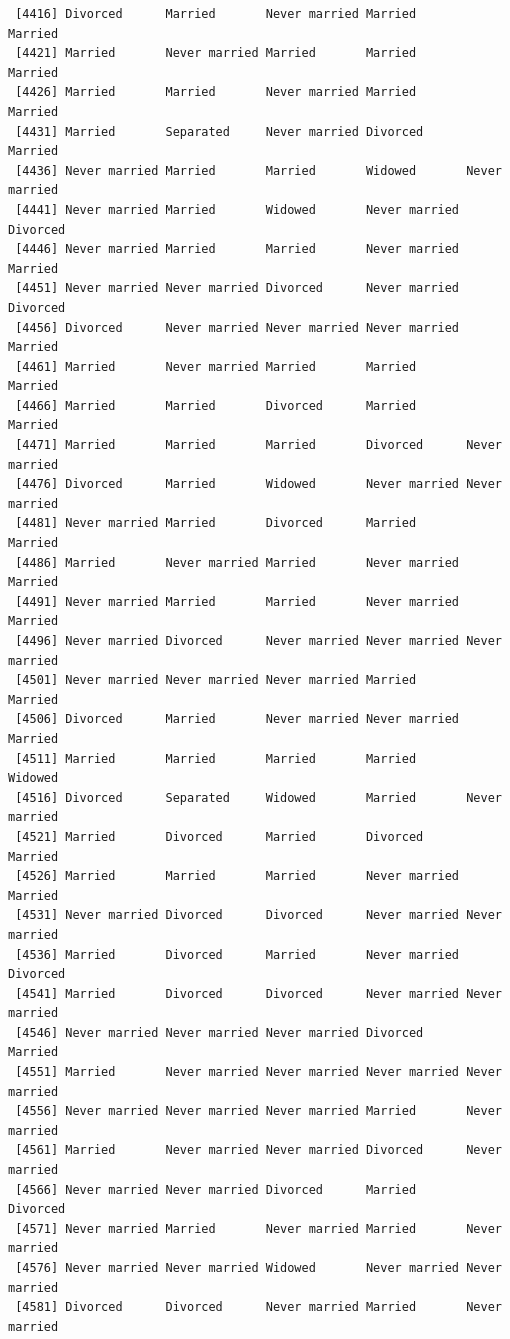 \documentclass[
  letterpaper,
  DIV=11,
  numbers=noendperiod,
  oneside]{scrartcl}
\begin{document}
\begin{verbatim}
 [4416] Divorced      Married       Never married Married       Married      
 [4421] Married       Never married Married       Married       Married      
 [4426] Married       Married       Never married Married       Married      
 [4431] Married       Separated     Never married Divorced      Married      
 [4436] Never married Married       Married       Widowed       Never married
 [4441] Never married Married       Widowed       Never married Divorced     
 [4446] Never married Married       Married       Never married Married      
 [4451] Never married Never married Divorced      Never married Divorced     
 [4456] Divorced      Never married Never married Never married Married      
 [4461] Married       Never married Married       Married       Married      
 [4466] Married       Married       Divorced      Married       Married      
 [4471] Married       Married       Married       Divorced      Never married
 [4476] Divorced      Married       Widowed       Never married Never married
 [4481] Never married Married       Divorced      Married       Married      
 [4486] Married       Never married Married       Never married Married      
 [4491] Never married Married       Married       Never married Married      
 [4496] Never married Divorced      Never married Never married Never married
 [4501] Never married Never married Never married Married       Married      
 [4506] Divorced      Married       Never married Never married Married      
 [4511] Married       Married       Married       Married       Widowed      
 [4516] Divorced      Separated     Widowed       Married       Never married
 [4521] Married       Divorced      Married       Divorced      Married      
 [4526] Married       Married       Married       Never married Married      
 [4531] Never married Divorced      Divorced      Never married Never married
 [4536] Married       Divorced      Married       Never married Divorced     
 [4541] Married       Divorced      Divorced      Never married Never married
 [4546] Never married Never married Never married Divorced      Married      
 [4551] Married       Never married Never married Never married Never married
 [4556] Never married Never married Never married Married       Never married
 [4561] Married       Never married Never married Divorced      Never married
 [4566] Never married Never married Divorced      Married       Divorced     
 [4571] Never married Married       Never married Married       Never married
 [4576] Never married Never married Widowed       Never married Never married
 [4581] Divorced      Divorced      Never married Married       Never married

\end{verbatim}
\end{document}
